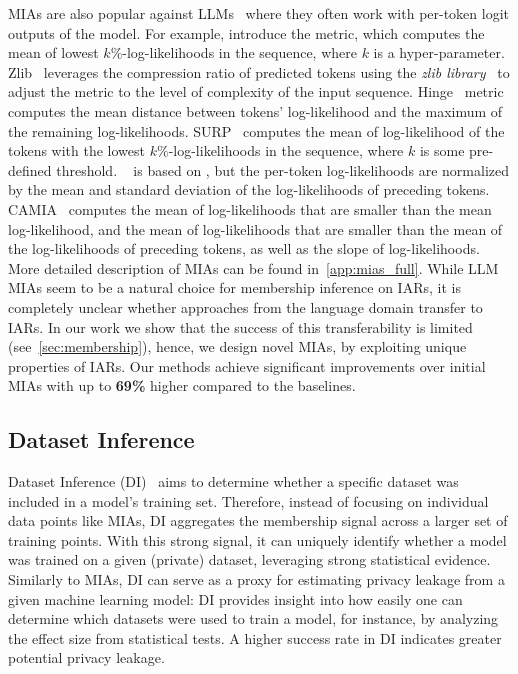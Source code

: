 MIAs are also popular against LLMs~\citep{mattern2023membershipLLM, shi2024detecting} where they often work with per-token logit outputs of the model.
For example, \citet{shi2024detecting} introduce the \mink metric, which computes the mean of lowest $k\%$-log-likelihoods in the sequence, where $k$ is a hyper-parameter.
Zlib~\citep{carlini2021extractLLM} leverages the compression ratio of predicted tokens using the \textit{zlib library}~\citep{zlib2004} to adjust the metric to the level of complexity of the input sequence. 
Hinge~\citep{bertran2024scalable} metric computes the mean distance between tokens' log-likelihood and the maximum of the remaining log-likelihoods. 
SURP~\citep{zhang2024adaptive} computes the mean of log-likelihood of the tokens with the lowest $k\%$-log-likelihoods in the sequence, where $k$ is some pre-defined threshold. 
\minkpp~\citep{zhang2024min} is based on \mink, but the per-token log-likelihoods are normalized by the mean and standard deviation of the log-likelihoods of preceding tokens. 
CAMIA~\citep{chang2024context} computes the mean of log-likelihoods that are smaller than the mean log-likelihood, and the mean of log-likelihoods that are smaller than the mean of the log-likelihoods of preceding tokens, as well as the slope of log-likelihoods. More detailed description of MIAs can be found in~\cref{app:mias_full}. While LLM MIAs seem to be a natural choice for membership inference on IARs, it is completely unclear whether approaches from the language domain transfer to IARs. In our work we show that the success of this transferability is limited (see~\cref{sec:membership}), 
hence, we design novel MIAs, by exploiting unique properties of IARs. 
Our methods achieve significant improvements over initial MIAs with up to \textbf{69\%} higher \tprat compared to the baselines.

\subsection{Dataset Inference}
Dataset Inference (DI)~\citep{maini2021dataset} aims to determine whether a specific dataset was included in a model's training set. 
Therefore, instead of focusing on individual data points like MIAs, DI aggregates the membership signal across a larger set of training points. With this strong signal, it can uniquely identify whether a model was trained on a given (private) dataset, leveraging strong statistical evidence. 
Similarly to MIAs, DI can serve as a proxy for estimating privacy leakage from a given machine learning model: DI provides insight into how easily one can determine which datasets were used to train a model, for instance, by analyzing the effect size from statistical tests. A higher success rate in DI indicates greater potential privacy leakage.

